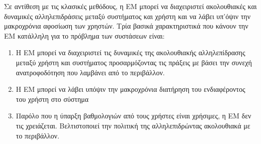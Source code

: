 Σε αντίθεση με τις κλασικές μεθόδους, η ΕΜ μπορεί να διαχειριστεί ακολουθιακές και δυναμικές αλληλεπιδράσεις μεταξύ συστήματος και χρήστη και να λάβει υπ'όψιν την μακροχρόνια αφοσίωση των χρηστών. Τρία βασικά χαρακτηριστικά που κάνουν την ΕΜ κατάλληλη για το πρόβλημα των συστάσεων είναι:
\begin{enumerate}
    \item Η ΕΜ μπορεί να διαχειριστεί τις δυναμικές της ακολουθιακής αλληλεπίδρασης μεταξύ χρήστη και συστήματος προσαρμόζοντας τις πράξεις με βάσει την συνεχή ανατροφοδότηση που λαμβάνει από το περιβάλλον.
    \item Η ΕΜ μπορεί να λάβει υπόψιν την μακροχρόνια διατήρηση του ενδιαφέροντος του χρήστη στο σύστημα
    \item Παρόλο που η ύπαρξη βαθμολογιών από τους χρήστες είναι χρήσιμες, η ΕΜ δεν τις χρειάζεται. Βελτιστοποιεί την πολιτική της αλληλεπιδρώντας ακολουθιακά με το περιβάλλον.
\end{enumerate}

